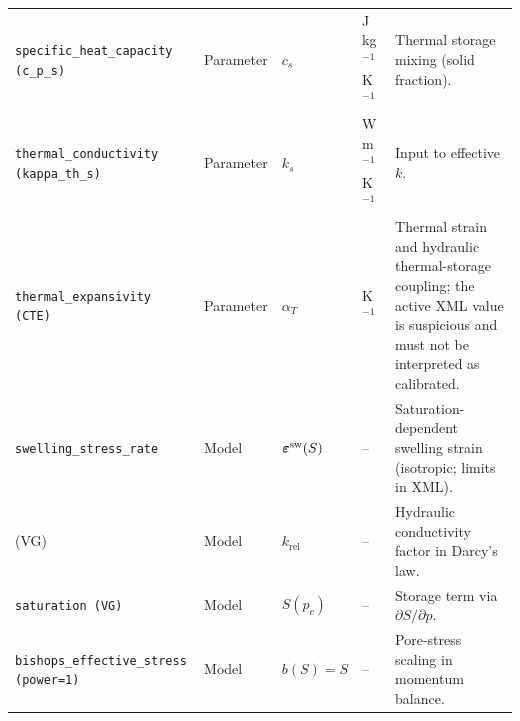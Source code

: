 \documentclass[10pt,a4paper]{article}
\newcommand{\pp}{p}
\newcommand{\Sat}{S}
\newcommand{\keff}{k}
\begin{document}
\begin{longtable}{P{4.5cm} P{2cm} P{1.5cm} P{2cm} P{7cm}}
\texttt{specific\_heat\_capacity (c\_p\_s)} & Parameter & \(c_s\) & J\,kg\(^{-1}\)K\(^{-1}\) &
Thermal storage mixing (solid fraction). \\
\texttt{thermal\_conductivity (kappa\_th\_s)} & Parameter & \(k_s\) & W\,m\(^{-1}\)K\(^{-1}\) &
Input to effective \(\keff\). \\
\texttt{thermal\_expansivity (CTE)} & Parameter & \(\alpha_T\) & K\(^{-1}\) &
Thermal strain and hydraulic thermal-storage coupling; the active XML value is suspicious and must not be interpreted as calibrated. \\
\texttt{swelling\_stress\_rate} & Model & \(\bm{\varepsilon}^{\rm sw}(\Sat)\) & -- &
Saturation-dependent swelling strain (isotropic; limits in XML). \\
 (VG) & Model & \(k_{\mathrm{rel}}\) & -- &
Hydraulic conductivity factor in Darcy’s law. \\
\texttt{saturation (VG)} & Model & \(\Sat(\pp_c)\) & -- &
Storage term via \(\partial \Sat/\partial \pp\). \\
\texttt{bishops\_effective\_stress (power=1)} & Model & \(b(\Sat)=\Sat\) & -- &
Pore-stress scaling in momentum balance. \\
\end{longtable}
\end{document}
